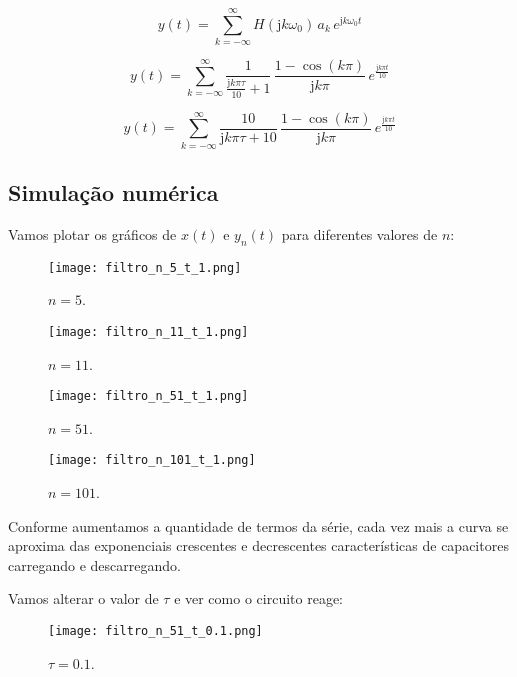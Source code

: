 \documentclass[10pt,twocolumn]{article}
\renewcommand{\j}{\ensuremath{\mathrm{j}}}
\newcommand{\?}{\stackrel{?}{=}}
\begin{document}
\begin{equation*}
	y(t)=\sum_{k=-\infty}^{\infty}H(\j k\omega_0)\,a_k\,e^{\j k\omega_0t}
\end{equation*}

\begin{equation*}
	y(t)=\sum_{k=-\infty}^{\infty}\frac{1}{\frac{\j k\pi\tau}{10}+1}\,\frac{1-\cos(k\pi)}{\j k\pi}\,e^{\frac{\j k\pi t}{10}}
\end{equation*}

\begin{equation*}
	y(t)=\sum_{k=-\infty}^{\infty}\frac{10}{\j k\pi\tau+10}\,\frac{1-\cos(k\pi)}{\j k\pi}\,e^{\frac{\j k\pi t}{10}}
\end{equation*}

\subsection{Simulação numérica}

Vamos plotar os gráficos de $x(t)$ e $y_n(t)$ para diferentes valores de $n$:

\FloatBarrier
\begin{figure}[h!]
	\texttt{[image: filtro\_n\_5\_t\_1.png]}
	\centering
	\caption{$n=5$.}
\end{figure}

\begin{figure}[h!]
	\texttt{[image: filtro\_n\_11\_t\_1.png]}
	\centering
	\caption{$n=11$.}
\end{figure}

\begin{figure}[h!]
	\texttt{[image: filtro\_n\_51\_t\_1.png]}
	\centering
	\caption{$n=51$.}
\end{figure}

\begin{figure}[h!]
	\texttt{[image: filtro\_n\_101\_t\_1.png]}
	\centering
	\caption{$n=101$.}
\end{figure}
\FloatBarrier

Conforme aumentamos a quantidade de termos da série, cada vez mais a curva se aproxima das exponenciais crescentes e decrescentes características de capacitores carregando e descarregando.

Vamos alterar o valor de $\tau$ e ver como o circuito reage:

\FloatBarrier
\begin{figure}[h!]
	\texttt{[image: filtro\_n\_51\_t\_0.1.png]}
	\centering
	\caption{$\tau=\num{0.1}$.}
\end{figure}
\end{document}
